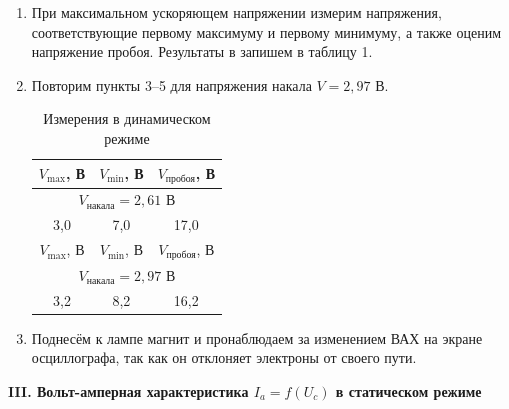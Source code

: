 \begin{enumerate}
		\item При максимальном ускоряющем напряжении измерим напряжения, соответствующие первому максимуму и первому минимуму, а также оценим напряжение пробоя. Результаты в запишем в таблицу 1.
		
		\item Повторим пункты 3--5 для напряжения накала $V = 2,97$ В.
		
		
		\begin{table}[h!]
			\centering
			\begin{tabular}{|ccc|}
				\hline
				\multicolumn{1}{|c|}{$V_{\text{max}}$, В} & \multicolumn{1}{c|}{$V_\text{min}$, В} & $V_\text{пробоя}$, В \\ \hline
				\multicolumn{3}{|c|}{$V_\text{накала} = 2,61$ В}                                                          \\ \hline
				\multicolumn{1}{|c|}{3,0}                 & \multicolumn{1}{c|}{7,0}              & 17,0                 \\ \hline
				\multicolumn{1}{|c|}{$V_{\text{max}}$, В} & \multicolumn{1}{c|}{$V_\text{min}$, В} & $V_\text{пробоя}$, В \\ \hline
				\multicolumn{3}{|c|}{$V_\text{накала} = 2,97$ В}                                                          \\ \hline
				\multicolumn{1}{|c|}{3,2}                 & \multicolumn{1}{c|}{8,2}              & 16,2                 \\ \hline
			\end{tabular}
			\caption{Измерения в динамическом режиме}
		\end{table}
		
		\item Поднесём к лампе магнит и пронаблюдаем за изменением ВАХ на экране осциллографа, так как он отклоняет электроны от своего пути.
	\end{enumerate}
	
	\begin{center}
		\textbf{III. Вольт-амперная характеристика $I_a = f(U_c)$ в статическом режиме}
	\end{center}

